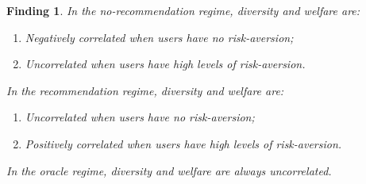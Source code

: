 \documentclass[manuscript]{acmart}
\newtheorem{finding}{Finding}
\begin{document}
\begin{finding}\label{finding_diversity_welfare_corr}
In the no-recommendation regime, diversity and welfare are:
\begin{enumerate}
\item Negatively correlated when users have no risk-aversion;
\item Uncorrelated when users have high levels of risk-aversion.
\end{enumerate}
In the recommendation regime, diversity and welfare are:
\begin{enumerate}
\item Uncorrelated when users have no risk-aversion;
\item Positively correlated when users have high levels of risk-aversion.
\end{enumerate}
In the oracle regime, diversity and welfare are always uncorrelated.
\end{finding}
\end{document}
